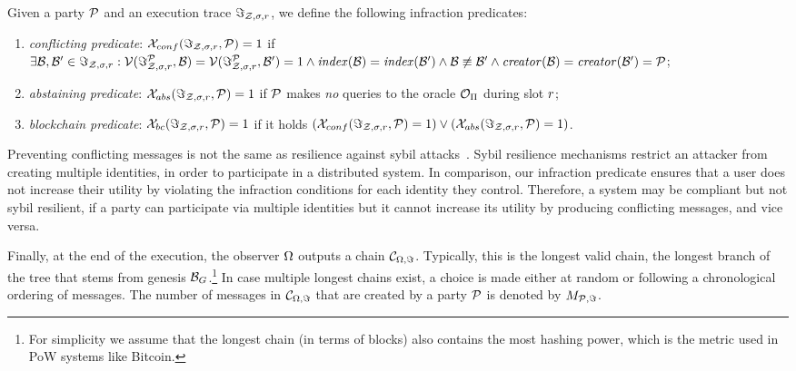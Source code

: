 \begin{definition}\label{def:blockchain-infraction}
    Given a party $\mathcal{P}$ and an execution trace $\Im_{\mathcal{Z}, \sigma, r}$,
    we define the following infraction predicates:
    \begin{enumerate}
        \item
            \emph{conflicting predicate}: $\mathcal{X}_{conf}(\Im_{\mathcal{Z}, \sigma, r}, \mathcal{P}) = 1$ if
            $\exists \mathcal{B}, \mathcal{B}'
            \in \Im_{\mathcal{Z}, \sigma, r}:\mathcal{V}(\Im_{\mathcal{Z}, \sigma, r}^{\mathcal{P}}, \mathcal{B})=\mathcal{V}(\Im_{\mathcal{Z}, \sigma, r}^{\mathcal{P}}, \mathcal{B}')=1\land
            \mathit{index}(\mathcal{B}) = \mathit{index}(\mathcal{B}') \land \mathcal{B} \not \equiv
            \mathcal{B}' \land \mathit{creator}(\mathcal{B}) = \mathit{creator}(\mathcal{B}') = \mathcal{P}$;
        \item
            \emph{abstaining predicate}: $\mathcal{X}_{abs}(\Im_{\mathcal{Z}, \sigma, r}, \mathcal{P}) = 1$ if
            $\mathcal{P}$ makes \emph{no} queries to the oracle $\mathcal{O}_\Pi$
            during slot $r$;
        \item
            \emph{blockchain predicate}: $\mathcal{X}_{bc}(\Im_{\mathcal{Z}, \sigma, r}, \mathcal{P}) = 1$ if it holds
            $(\mathcal{X}_{conf}(\Im_{\mathcal{Z}, \sigma, r}, \mathcal{P}) = 1) \lor (\mathcal{X}_{abs}(\Im_{\mathcal{Z}, \sigma, r}, \mathcal{P}) = 1)$.
    \end{enumerate}
\end{definition}

\begin{remark*}
Preventing conflicting messages is not the same
as resilience against sybil attacks~\cite{douceur2002sybil}. Sybil resilience
mechanisms restrict an attacker from creating multiple identities, in order to
participate in a distributed system. In comparison, our infraction predicate
ensures that a user does not increase their utility by violating the infraction
conditions for each identity they control. Therefore, a system may be compliant
but not sybil resilient, \eg if a party can participate via multiple identities
but it cannot increase its utility by producing conflicting messages, and vice
versa.
\end{remark*}

Finally, at the end of the execution, the observer $\Omega$ outputs a chain
$\mathcal{C}_{\Omega, \Im}$. Typically, this is the longest valid chain, \ie the longest
branch of the tree that stems from genesis $\mathcal{B}_G$.\footnote{For simplicity we assume that the longest chain (in terms of
blocks) also contains the most hashing power, which is the metric used in PoW
systems like Bitcoin.} In case multiple longest chains exist, a choice is made
either at random or following a chronological ordering of messages. The number
of messages in $\mathcal{C}_{\Omega, \Im}$ that are created by a party $\mathcal{P}$ is
denoted by $M_{\mathcal{P}, \Im}$.
